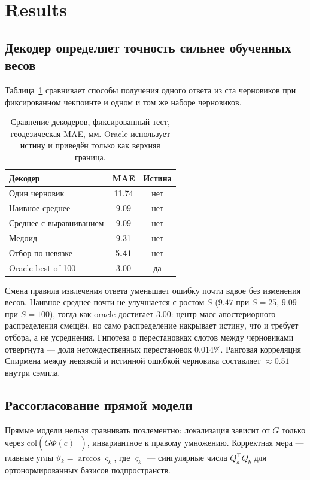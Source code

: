 \section{Results}

\subsection{Декодер определяет точность сильнее обученных весов}

Таблица~\ref{tab:decoders} сравнивает способы получения одного ответа из ста черновиков при фиксированном чекпоинте и одном и том же наборе черновиков.

\begin{table}[t]
\centering
\caption{Сравнение декодеров, фиксированный тест, геодезическая MAE, мм. Oracle использует истину и приведён только как верхняя граница.}
\label{tab:decoders}
\begin{tabular}{lcc}
\hline
Декодер & MAE & Истина \\
\hline
Один черновик & 11.74 & нет \\
Наивное среднее & 9.09 & нет \\
Среднее с выравниванием & 9.09 & нет \\
Медоид & 9.31 & нет \\
Отбор по невязке & \textbf{5.41} & нет \\
\hline
Oracle best-of-100 & 3.00 & да \\
\hline
\end{tabular}
\end{table}

Смена правила извлечения ответа уменьшает ошибку почти вдвое без изменения весов. Наивное среднее почти не улучшается с ростом $S$ ($9.47$ при $S=25$, $9.09$ при $S=100$), тогда как oracle достигает $3.00$: центр масс апостериорного распределения смещён, но само распределение накрывает истину, что и требует отбора, а не усреднения. Гипотеза о перестановках слотов между черновиками отвергнута --- доля нетождественных перестановок $0.014\%$. Ранговая корреляция Спирмена между невязкой и истинной ошибкой черновика составляет $\approx 0.51$ внутри сэмпла.

\subsection{Рассогласование прямой модели}

Прямые модели нельзя сравнивать поэлементно: локализация зависит от $G$ только через $\mathrm{col}(G\Phi(c)^{\top})$, инвариантное к правому умножению. Корректная мера --- главные углы $\vartheta_k=\arccos\varsigma_k$, где $\varsigma_k$ --- сингулярные числа $Q_a^{\top}Q_b$ для ортонормированных базисов подпространств.

